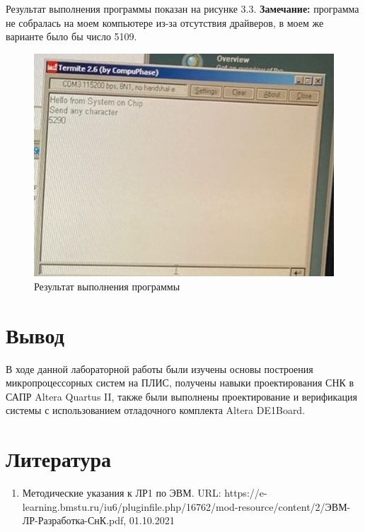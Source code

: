 \documentclass[12pt]{report}
\begin{document}
Результат выполнения программы показан на рисунке 3.3. 
\textbf{Замечание:} программа не собралась на моем компьютере из-за отсутствия драйверов, в моем же варианте было бы число 5109. 
\begin{figure}[hp!]
    \centering
    \includegraphics{report_files/Рисунок4.jpg}
    \caption{Результат выполнения программы}
    \label{fig:my_label4}
\end{figure}



\chapter{Вывод}

В ходе данной лабораторной работы были изучены основы построения микропроцессорных систем на ПЛИС, получены навыки проектирования СНК в САПР Altera Quartus II, также были выполнены проектирование и верификация системы с использованием отладочного комплекта Altera DE1Board.

\chapter*{Литература}
\begin{enumerate}
	\item Методические указания к ЛР1 по ЭВМ. URL: https://e-learning.bmstu.ru/iu6/pluginfile.php/16762/mod-resource/content/2/ЭВМ-ЛР-Разработка-СнК.pdf, 01.10.2021

\end{enumerate}
	

\end{document}
